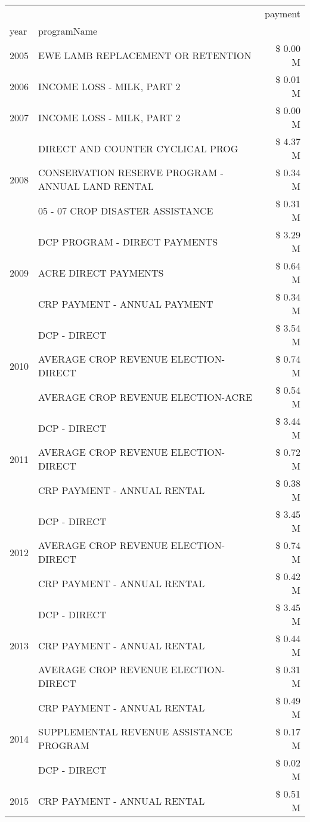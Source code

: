 \begin{tabular}{llr}
\toprule
 &  & payment \\
year & programName &  \\
\midrule
2005 & EWE LAMB REPLACEMENT OR RETENTION & \$ 0.00 M \\
\cline{1-3}
2006 & INCOME LOSS - MILK, PART 2 & \$ 0.01 M \\
\cline{1-3}
2007 & INCOME LOSS - MILK, PART 2 & \$ 0.00 M \\
\cline{1-3}
\multirow[t]{3}{*}{2008} & DIRECT AND COUNTER CYCLICAL PROG & \$ 4.37 M \\
 & CONSERVATION RESERVE PROGRAM - ANNUAL LAND RENTAL & \$ 0.34 M \\
 & 05 - 07 CROP DISASTER ASSISTANCE & \$ 0.31 M \\
\cline{1-3}
\multirow[t]{3}{*}{2009} & DCP PROGRAM - DIRECT PAYMENTS & \$ 3.29 M \\
 & ACRE DIRECT PAYMENTS & \$ 0.64 M \\
 & CRP PAYMENT - ANNUAL PAYMENT & \$ 0.34 M \\
\cline{1-3}
\multirow[t]{3}{*}{2010} & DCP - DIRECT & \$ 3.54 M \\
 & AVERAGE CROP REVENUE ELECTION-DIRECT & \$ 0.74 M \\
 & AVERAGE CROP REVENUE ELECTION-ACRE & \$ 0.54 M \\
\cline{1-3}
\multirow[t]{3}{*}{2011} & DCP - DIRECT & \$ 3.44 M \\
 & AVERAGE CROP REVENUE ELECTION-DIRECT & \$ 0.72 M \\
 & CRP PAYMENT - ANNUAL RENTAL & \$ 0.38 M \\
\cline{1-3}
\multirow[t]{3}{*}{2012} & DCP - DIRECT & \$ 3.45 M \\
 & AVERAGE CROP REVENUE ELECTION-DIRECT & \$ 0.74 M \\
 & CRP PAYMENT - ANNUAL RENTAL & \$ 0.42 M \\
\cline{1-3}
\multirow[t]{3}{*}{2013} & DCP - DIRECT & \$ 3.45 M \\
 & CRP PAYMENT - ANNUAL RENTAL & \$ 0.44 M \\
 & AVERAGE CROP REVENUE ELECTION-DIRECT & \$ 0.31 M \\
\cline{1-3}
\multirow[t]{3}{*}{2014} & CRP PAYMENT - ANNUAL RENTAL & \$ 0.49 M \\
 & SUPPLEMENTAL REVENUE ASSISTANCE PROGRAM & \$ 0.17 M \\
 & DCP - DIRECT & \$ 0.02 M \\
\cline{1-3}
\multirow[t]{3}{*}{2015} & CRP PAYMENT - ANNUAL RENTAL & \$ 0.51 M \\

\end{tabular}
